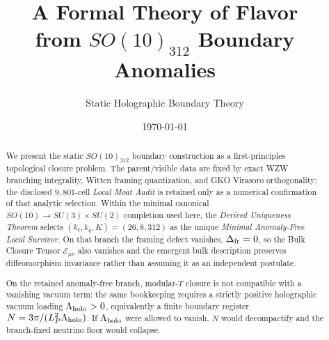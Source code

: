 \documentclass[11pt]{article}
\title{A Formal Theory of Flavor\\from $SO(10)_{312}$ Boundary Anomalies}
\author{Static Holographic Boundary Theory}
\date{\today}
\begin{document}
\maketitle

\begin{abstract}
We present the static $SO(10)_{312}$ boundary construction as a first-principles
topological closure problem. The parent/visible data are fixed by exact WZW
branching integrality, Witten framing quantization, and GKO Virasoro
orthogonality; the disclosed $9{,}801$-cell \emph{Local Moat Audit} is retained
only as a numerical confirmation of that analytic selection. Within the minimal
canonical $SO(10)\to SU(3)\times SU(2)$ completion used here, the
\emph{Derived Uniqueness Theorem} selects $(k_{\ell},k_q,K)=(26,8,312)$ as the
unique \emph{Minimal Anomaly-Free Local Survivor}. On that branch the framing
defect vanishes, $\Delta_{\rm fr}=0$, so the Bulk Closure Tensor
$\mathcal E_{\mu\nu}$ also vanishes and the emergent bulk description preserves
diffeomorphism invariance rather than assuming it as an independent postulate.

On the retained anomaly-free branch, modular-$T$ closure is not compatible with
a vanishing vacuum term: the same bookkeeping requires a strictly positive
holographic vacuum loading $\Lambda_{\rm holo}>0$, equivalently a finite
boundary register $N=3\pi/(L_P^2\Lambda_{\rm holo})$. If
$\Lambda_{\rm holo}$ were allowed to vanish, $N$ would decompactify and the
branch-fixed neutrino floor would collapse.


\end{abstract}
\end{document}
